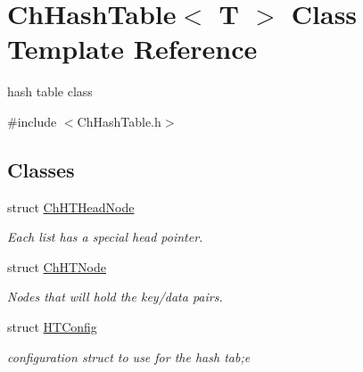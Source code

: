 \hypertarget{classChHashTable}{\section{Ch\-Hash\-Table$<$ T $>$ Class Template Reference}
\label{classChHashTable}
}


hash table class  




{\ttfamily \#include $<$Ch\-Hash\-Table.\-h$>$}

\subsection*{Classes}
\begin{DoxyCompactItemize}
\item 
struct \hyperlink{structChHashTable_1_1ChHTHeadNode}{Ch\-H\-T\-Head\-Node}
\begin{DoxyCompactList}\small\item\em Each list has a special head pointer. \end{DoxyCompactList}\item 
struct \hyperlink{structChHashTable_1_1ChHTNode}{Ch\-H\-T\-Node}
\begin{DoxyCompactList}\small\item\em Nodes that will hold the key/data pairs. \end{DoxyCompactList}\item 
struct \hyperlink{structChHashTable_1_1HTConfig}{H\-T\-Config}
\begin{DoxyCompactList}\small\item\em configuration struct to use for the hash tab;e \end{DoxyCompactList}\end{DoxyCompactItemize}
